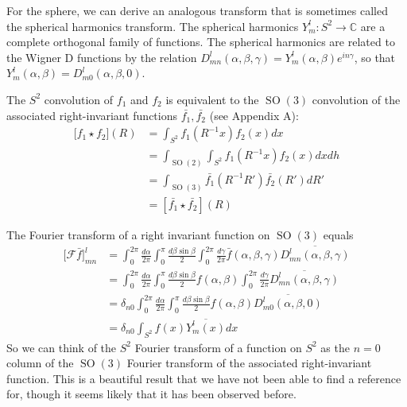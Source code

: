 \documentclass{article} %
\newcommand{\C}{\mathbb{C}}
\newcommand{\SO}[1]{\ensuremath{\operatorname{SO}(#1)}}
\begin{document}
For the sphere, we can derive an analogous transform that is sometimes called the spherical harmonics transform.
The spherical harmonics $Y^l_m : S^2 \rightarrow \C$ are a complete orthogonal family of functions.
The spherical harmonics are related to the Wigner D functions by the relation $D^l_{mn}(\alpha, \beta, \gamma) = Y^l_m(\alpha,\beta) e^{in\gamma}$, so that $Y^l_m(\alpha, \beta) = D^l_{m0}(\alpha, \beta, 0)$.

The $S^2$ convolution of $f_1$ and $f_2$ is equivalent to the $\SO3$ convolution of the associated right-invariant functions $\bar{f_1}, \bar{f_2}$ (see Appendix A):
\begin{equation}
  \begin{aligned}
    \lbrack f_1 \star f_2 ] (R)
    &=
    \int_{S^2} f_1(R^{-1} x) f_2(x) dx \\
    &=
    \int_{\SO2} \int_{S^2} f_1(R^{-1} x) f_2(x) dx dh \\
    &=
    \int_{\SO3} \bar{f_1}(R^{-1} R') \bar{f_2}(R') dR' \\
    &=
    [\bar{f_1} \star \bar{f_2}](R)
  \end{aligned}
\end{equation}

The Fourier transform of a right invariant function on $\SO3$ equals
\begin{equation}
  \begin{aligned}
    \lbrack \mathcal{F} \bar{f}]^l_{mn}
      &=
       \int_0^{2\pi} \frac{d\alpha}{2\pi} \int_0^\pi \frac{d\beta \sin \beta}{2} \int_0^{2\pi} \frac{d\gamma}{2\pi} \bar{f}(\alpha, \beta, \gamma) \overline{D^l_{mn}(\alpha, \beta, \gamma)} \\
      &=
       \int_0^{2\pi} \frac{d\alpha}{2\pi} \int_0^\pi \frac{d\beta \sin \beta}{2} f(\alpha, \beta) \int_0^{2\pi} \frac{d\gamma}{2\pi} \overline{D^l_{mn}(\alpha, \beta, \gamma)} \\
      &=
       \delta_{n0} \int_0^{2\pi} \frac{d\alpha}{2\pi} \int_0^\pi \frac{d\beta \sin \beta}{2} f(\alpha, \beta) \overline{D^l_{m0}(\alpha, \beta, 0)} \\
      &=
       \delta_{n0} \int_{S^2} f(x) \overline{Y^l_m(x)} dx
  \end{aligned}
\end{equation}
So we can think of the $S^2$ Fourier transform of a function on $S^2$ as the $n=0$ column of the $\SO3$ Fourier transform of the associated right-invariant function.
This is a beautiful result that we have not been able to find a reference for, though it seems likely that it has been observed before.
\end{document}
